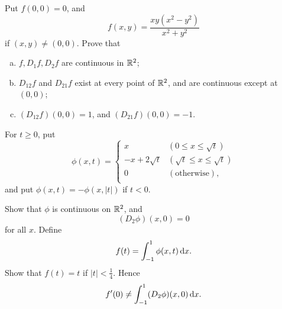 \begin{myexercise}
    \label{ex:9.27}
    Put $f(0,0)=0$, and 
    \begin{equation*}
        f(x,y) = \frac{xy(x^2-y^2)}{x^2+y^2}
    \end{equation*}
    if $(x,y) \neq (0,0)$.
    Prove that 
    \begin{enumerate}[(a)]
        \item $f, D_1 f, D_2 f$ are continuous in ${\protect\mathbb R}^2$;
        \item $D_{12}f$ and $D_{21}f$ exist at every point of ${\protect\mathbb R}^2$, and are continuous except at $(0, 0)$;
        \item $(D_{12}f)(0,0)=1$, and $(D_{21}f)(0,0)=-1$.
    \end{enumerate}
\end{myexercise}


\begin{myexercise}
    \label{ex:9.28}
    For $t \geq 0$, put
    \begin{equation*}
        \phi(x,t) = \left\{ 
            \begin{array}{ll}
                x & (0 \leq x \leq \sqrt{t}) \\
                -x+2\sqrt{t} & (\sqrt{t} \leq x \leq \sqrt{t}) \\
                0 & (\text{otherwise}), \\
            \end{array}
         \right.
    \end{equation*}
    and put $\phi(x,t)=-\phi(x,|t|)$ if $t<0$.

    Show that $\phi$ is continuous on ${\protect\mathbb R}^2$, and 
    \begin{equation*}
        (D_2 \phi)(x, 0) = 0
    \end{equation*}
    for all $x$. 
    Define 
    \begin{equation*}
        f(t) = \int_{-1}^{1} \phi (x,t) \d x.
    \end{equation*}
    Show that $f(t)=t$ if $|t|<\frac{1}{4}$.
    Hence 
    \begin{equation*}
        f'(0) \neq \int_{-1}^{1} (D_2 \phi) (x,0) \d x.
    \end{equation*}
\end{myexercise}


